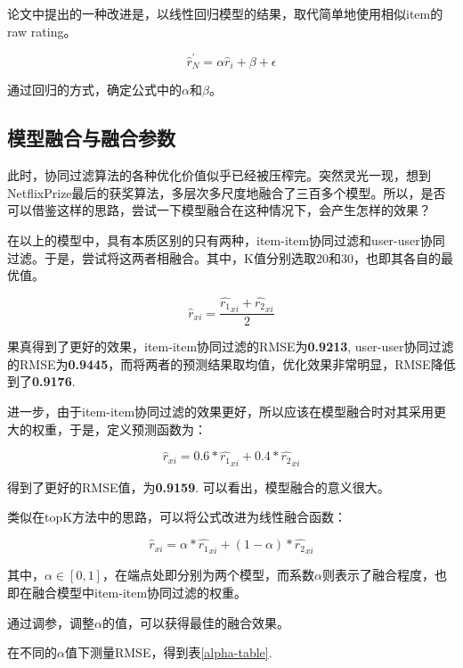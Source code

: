 \documentclass[utf8, a4paper, 11pt, onecolumn]{ctexart}
\begin{document}
\begin{spacing}{1.3}
论文\cite{sarwar2001item}中提出的一种改进是，以线性回归模型的结果，取代简单地使用相似item的raw rating。

\[\hat{r}^{'}_{N} = \alpha \hat{r}_i + \beta + \epsilon \]

通过回归的方式，确定公式中的$\alpha$和$\beta$。

\subsection{模型融合与融合参数}

此时，协同过滤算法的各种优化价值似乎已经被压榨完。突然灵光一现，想到NetflixPrize最后的获奖算法，多层次多尺度地融合了三百多个模型\cite{koren2009bellkor}。所以，是否可以借鉴这样的思路，尝试一下模型融合在这种情况下，会产生怎样的效果？

在以上的模型中，具有本质区别的只有两种，item-item协同过滤和user-user协同过滤。于是，尝试将这两者相融合。其中，K值分别选取20和30，也即其各自的最优值。

\[\hat{r}_{xi} = \frac{\hat{r_1}_{xi} + \hat{r_2}_{xi}}{2}\]

果真得到了更好的效果，item-item协同过滤的RMSE为\textbf{0.9213}, user-user协同过滤的RMSE为\textbf{0.9445}，而将两者的预测结果取均值，优化效果非常明显，RMSE降低到了\textbf{0.9176}.

进一步，由于item-item协同过滤的效果更好，所以应该在模型融合时对其采用更大的权重，于是，定义预测函数为：

\[\hat{r}_{xi} = 0.6 * \hat{r_1}_{xi} + 0.4 * \hat{r_2}_{xi}\]

得到了更好的RMSE值，为\textbf{0.9159}. 可以看出，模型融合的意义很大。

类似在topK方法中的思路，可以将公式改进为线性融合函数：

\[\hat{r}_{xi} = \alpha * \hat{r_1}_{xi} + (1-\alpha) * \hat{r_2}_{xi}\]

其中，$\alpha \in [0, 1]$，在端点处即分别为两个模型，而系数$\alpha$则表示了融合程度，也即在融合模型中item-item协同过滤的权重。

通过调参，调整$\alpha$的值，可以获得最佳的融合效果。

在不同的$\alpha$值下测量RMSE，得到表\ref{alpha-table}.


\end{spacing}
\end{document}
